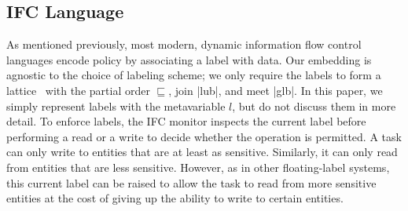 










\subsection{IFC Language}

As mentioned previously, most modern, dynamic information flow control
languages encode policy by associating a label with data.  Our
embedding is agnostic to the choice of labeling scheme; we only require
the labels to form a lattice~\cite{Denning:1976:LMS:360051.360056} with
the partial order $\sqsubseteq$, join |lub|, and meet |glb|.  In this
paper, we simply represent labels with the metavariable $l$, but do not
discuss them in more detail.
%
To enforce labels, the IFC monitor inspects the
current label  before performing a read or a write to decide whether the operation is permitted.
%
A task can only write to entities that are at least as sensitive.
%
Similarly, it can only read from entities that are less sensitive.
%
However, as in other floating-label systems, this current label can be raised
to allow the task to read from more sensitive entities at the cost of giving up
the ability to write to certain entities.


